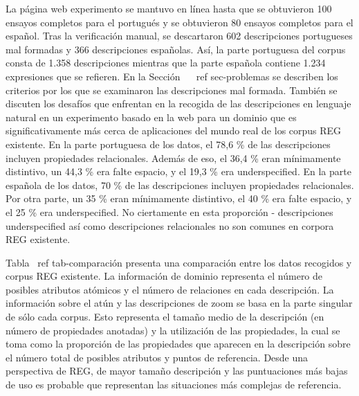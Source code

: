 La p\'agina web experimento se mantuvo en l\'{i}nea hasta que se obtuvieron 100 ensayos completos para el portugu\'es y se obtuvieron 80 ensayos completos para el espa\~nol. Tras la verificaci\'on manual, se descartaron 602 descripciones portugueses mal formadas y 366 descripciones espa\~nolas. As\'{i}, la parte portuguesa del corpus consta de 1.358 descripciones mientras que la parte espa\~nola contiene 1.234 expresiones que se refieren. En la Secci\'on ~ \ ref {sec-problemas} se describen los criterios por los que se examinaron las descripciones mal formada. Tambi\'en se discuten los desaf\'{i}os que enfrentan en la recogida de las descripciones en lenguaje natural en un experimento basado en la web para un dominio que es significativamente m\'as cerca de aplicaciones del mundo real de los corpus REG existente.
En la parte portuguesa de los datos, el 78,6 \% de las descripciones incluyen propiedades relacionales. Adem\'as de eso, el 36,4 \% eran m\'{i}nimamente distintivo, un 44,3 \% era falte espacio, y el 19,3 \% era underspecified. En la parte espa\~nola de los datos, 70 \% de las descripciones incluyen propiedades relacionales. Por otra parte, un 35 \% eran m\'{i}nimamente distintivo, el 40 \% era falte espacio, y el 25 \% era underspecified. No ciertamente en esta proporci\'on - descripciones underspecified as\'{i} como descripciones relacionales no son comunes en corpora REG existente.

Tabla \ ref {tab-comparaci\'on} presenta una comparaci\'on entre los datos recogidos y corpus REG existente. La informaci\'on de dominio representa el n\'umero de posibles atributos at\'omicos y el n\'umero de relaciones en cada descripci\'on. La informaci\'on sobre el at\'un y las descripciones de zoom se basa en la parte singular de s\'olo cada corpus. Esto representa el tama\~no medio de la descripci\'on (en n\'umero de propiedades anotadas) y la utilizaci\'on de las propiedades, la cual se toma como la proporci\'on de las propiedades que aparecen en la descripci\'on sobre el n\'umero total de posibles atributos y puntos de referencia. Desde una perspectiva de REG, de mayor tama\~no descripci\'on y las puntuaciones m\'as bajas de uso es probable que representan las situaciones m\'as complejas de referencia.


